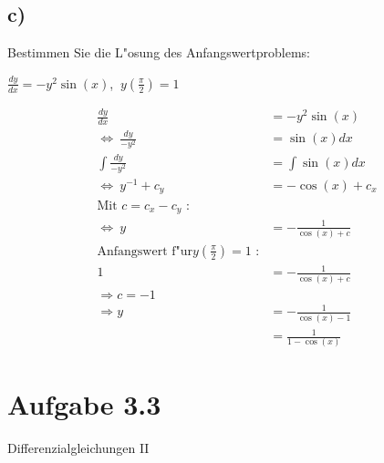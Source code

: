 \documentclass{theozettel}
\begin{document}
\subsection*{c)} Bestimmen Sie die L"osung des Anfangswertproblems:
\begin{center}
$\frac{dy}{dx} = -y^2 \sin\left(x\right)$,  $ \ y\left(\frac{\pi}{2}\right)=1$
\end{center}
\begin{align*}
\frac{dy}{dx} &= -y^2 \sin\left(x\right)\\
\Leftrightarrow \ \frac{dy}{-y^2} &= \sin\left(x\right) dx\\
\int \frac{dy}{-y^2} &= \int \sin\left(x\right) dx\\
\Leftrightarrow \ y^{-1} +c_y&= -\cos\left(x\right)+c_x\\
\text{Mit }c=c_x-c_y \text{ :}\\
\Leftrightarrow \ y &= -\frac{1}{\cos\left(x\right)+c}\\
\text{Anfangswert f"ur}y\left(\frac{\pi}{2}\right)=1 \text{ :}\\
1&=-\frac{1}{\cos\left(x\right)+c}\\
\Rightarrow c=-1\\
\Rightarrow y&=-\frac{1}{\cos\left(x\right)-1}\\
&=\frac{1}{1-\cos\left(x\right)}
\end{align*}
\newpage
\section*{Aufgabe 3.3}Differenzialgleichungen II\\


\newpage
\end{document}
